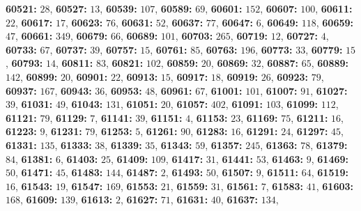 \textsf{\bfseries 60521:} $28$, \textsf{\bfseries 60527:} $13$, \textsf{\bfseries 60539:} $107$, \textsf{\bfseries 60589:} $69$, \textsf{\bfseries 60601:} $152$, \textsf{\bfseries 60607:} $100$, \textsf{\bfseries 60611:} $22$, \textsf{\bfseries 60617:} $17$, \textsf{\bfseries 60623:} $76$, \textsf{\bfseries 60631:} $52$, \textsf{\bfseries 60637:} $77$, \textsf{\bfseries 60647:} $6$, \textsf{\bfseries 60649:} $118$, \textsf{\bfseries 60659:} $47$, \textsf{\bfseries 60661:} $349$, \textsf{\bfseries 60679:} $66$, \textsf{\bfseries 60689:} $101$, \textsf{\bfseries 60703:} $265$, \textsf{\bfseries 60719:} $12$, \textsf{\bfseries 60727:} $4$, \textsf{\bfseries 60733:} $67$, \textsf{\bfseries 60737:} $39$, \textsf{\bfseries 60757:} $15$, \textsf{\bfseries 60761:} $85$, \textsf{\bfseries 60763:} $196$, \textsf{\bfseries 60773:} $33$, \textsf{\bfseries 60779:} $15$, \textsf{\bfseries 60793:} $14$, \textsf{\bfseries 60811:} $83$, \textsf{\bfseries 60821:} $102$, \textsf{\bfseries 60859:} $20$, \textsf{\bfseries 60869:} $32$, \textsf{\bfseries 60887:} $65$, \textsf{\bfseries 60889:} $142$, \textsf{\bfseries 60899:} $20$, \textsf{\bfseries 60901:} $22$, \textsf{\bfseries 60913:} $15$, \textsf{\bfseries 60917:} $18$, \textsf{\bfseries 60919:} $26$, \textsf{\bfseries 60923:} $79$, \textsf{\bfseries 60937:} $167$, \textsf{\bfseries 60943:} $36$, \textsf{\bfseries 60953:} $48$, \textsf{\bfseries 60961:} $67$, \textsf{\bfseries 61001:} $101$, \textsf{\bfseries 61007:} $91$, \textsf{\bfseries 61027:} $39$, \textsf{\bfseries 61031:} $49$, \textsf{\bfseries 61043:} $131$, \textsf{\bfseries 61051:} $20$, \textsf{\bfseries 61057:} $402$, \textsf{\bfseries 61091:} $103$, \textsf{\bfseries 61099:} $112$, \textsf{\bfseries 61121:} $79$, \textsf{\bfseries 61129:} $7$, \textsf{\bfseries 61141:} $39$, \textsf{\bfseries 61151:} $4$, \textsf{\bfseries 61153:} $23$, \textsf{\bfseries 61169:} $75$, \textsf{\bfseries 61211:} $16$, \textsf{\bfseries 61223:} $9$, \textsf{\bfseries 61231:} $79$, \textsf{\bfseries 61253:} $5$, \textsf{\bfseries 61261:} $90$, \textsf{\bfseries 61283:} $16$, \textsf{\bfseries 61291:} $24$, \textsf{\bfseries 61297:} $45$, \textsf{\bfseries 61331:} $135$, \textsf{\bfseries 61333:} $38$, \textsf{\bfseries 61339:} $35$, \textsf{\bfseries 61343:} $59$, \textsf{\bfseries 61357:} $245$, \textsf{\bfseries 61363:} $78$, \textsf{\bfseries 61379:} $84$, \textsf{\bfseries 61381:} $6$, \textsf{\bfseries 61403:} $25$, \textsf{\bfseries 61409:} $109$, \textsf{\bfseries 61417:} $31$, \textsf{\bfseries 61441:} $53$, \textsf{\bfseries 61463:} $9$, \textsf{\bfseries 61469:} $50$, \textsf{\bfseries 61471:} $45$, \textsf{\bfseries 61483:} $144$, \textsf{\bfseries 61487:} $2$, \textsf{\bfseries 61493:} $50$, \textsf{\bfseries 61507:} $9$, \textsf{\bfseries 61511:} $64$, \textsf{\bfseries 61519:} $16$, \textsf{\bfseries 61543:} $19$, \textsf{\bfseries 61547:} $169$, \textsf{\bfseries 61553:} $21$, \textsf{\bfseries 61559:} $31$, \textsf{\bfseries 61561:} $7$, \textsf{\bfseries 61583:} $41$, \textsf{\bfseries 61603:} $168$, \textsf{\bfseries 61609:} $139$, \textsf{\bfseries 61613:} $2$, \textsf{\bfseries 61627:} $71$, \textsf{\bfseries 61631:} $40$, \textsf{\bfseries 61637:} $134$, 
